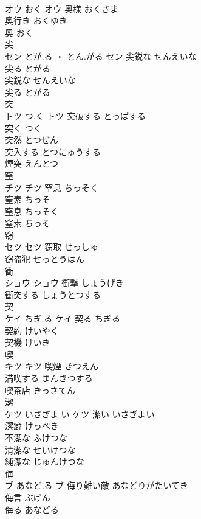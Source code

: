 \documentclass[8pt]{extreport}
\begin{document}
\begin{CJK}{UTF8}{min}
\\	オウ	おく	オウ	奥様	おくさま	
\\	奥行き	おくゆき	
\\	奥	おく	
\\	尖	
\\	セン	とが.る ・ とん.がる	セン	尖鋭な	せんえいな	
\\	尖る	とがる	
\\	尖鋭な	せんえいな	
\\	尖る	とがる	
\\	突	
\\	トツ	つ.く	トツ	突破する	とっぱする	
\\	突く	つく	
\\	突然	とつぜん	
\\	突入する	とつにゅうする	
\\	煙突	えんとつ	
\\	窒	
\\	チツ		チツ	窒息	ちっそく	
\\	窒素	ちっそ	
\\	窒息	ちっそく	
\\	窒素	ちっそ	
\\	窃	
\\	セツ		セツ	窃取	せっしゅ	
\\	窃盗犯	せっとうはん	
\\	衝	
\\	ショウ		ショウ	衝撃	しょうげき	
\\	衝突する	しょうとつする	
\\	契	
\\	ケイ	ちぎ.る	ケイ	契る	ちぎる	
\\	契約	けいやく	
\\	契機	けいき	
\\	喫	
\\	キツ		キツ	喫煙	きつえん	
\\	満喫する	まんきつする	
\\	喫茶店	きっさてん	
\\	潔	
\\	ケツ	いさぎよ.い	ケツ	潔い	いさぎよい	
\\	潔癖	けっぺき	
\\	不潔な	ふけつな	
\\	清潔な	せいけつな	
\\	純潔な	じゅんけつな	
\\	侮	
\\	ブ	あなど.る	ブ	侮り難い敵	あなどりがたいてき	
\\	侮言	ぶげん	
\\	侮る	あなどる	

\end{CJK}
\end{document}
